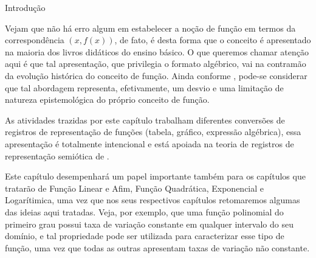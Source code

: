 \begin{apresentacao}{Introdução}
\begin{quote}
\vspace{-.5\parskip}
\citep[p. 75]{rezende2012}
\end{quote}
\vspace{-1.5\parskip}

Vejam que não há erro algum em estabelecer a noção de função em termos da correspondência $(x,f(x))$, de fato, é desta forma que o conceito é apresentado na maioria dos livros didáticos do ensino básico. O que queremos chamar atenção aqui é que tal apresentação, que privilegia o formato algébrico, vai na contramão da evolução histórica do conceito de função. Ainda conforme \cite[p. 75]{rezende2012}, pode-se considerar que tal abordagem representa, efetivamente, um desvio e uma limitação de natureza epistemológica do próprio conceito de função.

As atividades trazidas por este capítulo trabalham diferentes conversões de registros de representação de funções (tabela, gráfico, expressão algébrica), essa apresentação é totalmente intencional e está apoiada na teoria de registros de representação semiótica de \cite{duval1993}.

Este capítulo desempenhará um papel importante também para os capítulos que tratarão de Função Linear e Afim, Função Quadrática, Exponencial e Logarítimica, uma vez que nos seus respectivos capítulos retomaremos algumas das ideias aqui tratadas. Veja, por exemplo, que uma função polinomial do primeiro grau possui taxa de variação constante em qualquer intervalo do seu domínio, e tal propriedade pode ser utilizada para caracterizar esse tipo de função, uma vez que todas as outras apresentam taxas de variação não constante.


\end{apresentacao}
